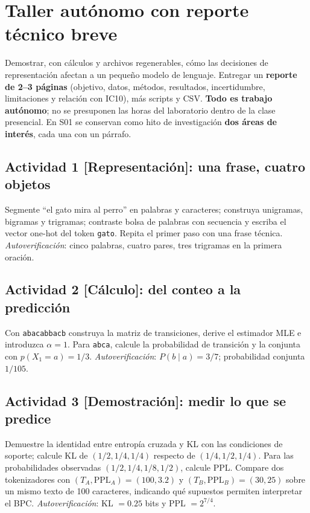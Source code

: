 
\chapter*{Taller autónomo con reporte técnico breve}
\label{mod:taller}
\begin{taller}
Demostrar, con cálculos y archivos regenerables, cómo las decisiones de
representación afectan a un pequeño modelo de lenguaje. Entregar un
\textbf{reporte de 2--3 páginas} (objetivo, datos, métodos, resultados,
incertidumbre, limitaciones y relación con IC10), más scripts y CSV.
\textbf{Todo es trabajo autónomo}; no se presuponen las horas del laboratorio
dentro de la clase presencial. En S01 se conservan como hito de investigación
\textbf{dos áreas de interés}, cada una con un párrafo.
\end{taller}
\section*{Actividad 1 [Representación]: una frase, cuatro objetos}
Segmente ``el gato mira al perro'' en palabras y caracteres; construya
unigramas, bigramas y trigramas; contraste bolsa de palabras con secuencia y
escriba el vector one-hot del token \texttt{gato}. Repita el primer paso con
una frase técnica. \emph{Autoverificación}: cinco palabras, cuatro pares,
tres trigramas en la primera oración.
\section*{Actividad 2 [Cálculo]: del conteo a la predicción}
Con \texttt{abacabbacb} construya la matriz de transiciones, derive el
estimador MLE e introduzca $\alpha=1$. Para \texttt{abca}, calcule la
probabilidad de transición y la conjunta con $p(X_1=a)=1/3$.
\emph{Autoverificación}: $P(b\mid a)=3/7$; probabilidad conjunta $1/105$.
\section*{Actividad 3 [Demostración]: medir lo que se predice}
Demuestre la identidad entre entropía cruzada y KL con las condiciones de
soporte; calcule KL de $(1/2,1/4,1/4)$ respecto de
$(1/4,1/2,1/4)$. Para las probabilidades observadas
$(1/2,1/4,1/8,1/2)$, calcule PPL. Compare dos tokenizadores con
$(T_A,\mathrm{PPL}_A)=(100,3.2)$ y $(T_B,\mathrm{PPL}_B)=(30,25)$
sobre un mismo texto de 100 caracteres, indicando qué supuestos permiten
interpretar el BPC. \emph{Autoverificación}: KL $=0.25$ bits y
PPL $=2^{7/4}$.
